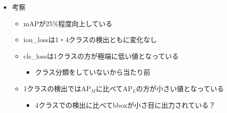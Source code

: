 \documentclass[a4j]{ujarticle}
\begin{document}
\begin{itemize}
\begin{table}[h]
                \end{table}
                \begin{itemize}
                    \item 考察
                    \begin{itemize}
                        \item mAPが25\%程度向上している
                        \item iou\_lossは1・4クラスの検出ともに変化なし
                        \item cls\_lossは1クラスの方が極端に低い値となっている
                        \begin{itemize}
                            \item クラス分類をしていないから当たり前
                        \end{itemize}
                        \item 1クラスの検出ではAP$_M$に比べてAP$_L$の方が小さい値となっている
                        \begin{itemize}
                            \item 4クラスでの検出に比べてbboxが小さ目に出力されている？
                        \end{itemize}
                    \end{itemize}
                \end{itemize}
            \end{itemize}
    
\end{document}
